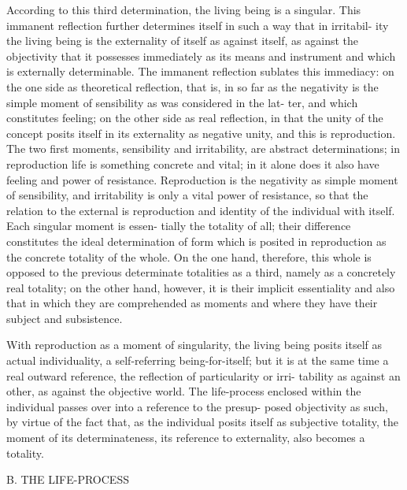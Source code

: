 According to this third determination, the living being is a singular. This
immanent reflection further determines itself in such a way that in irritabil-
ity the living being is the externality of itself as against itself, as against the
objectivity that it possesses immediately as its means and instrument and
which is externally determinable. The immanent reflection sublates this
immediacy: on the one side as theoretical reflection, that is, in so far as the
negativity is the simple moment of sensibility as was considered in the lat-
ter, and which constitutes feeling; on the other side as real reflection, in that
the unity of the concept posits itself in its externality as negative unity, and
this is reproduction.
 The two first moments, sensibility and irritability, are
abstract determinations; in reproduction life is something concrete and vital;
in it alone does it also have feeling and power of resistance. Reproduction
is the negativity as simple moment of sensibility, and irritability is only a
vital power of resistance, so that the relation to the external is reproduction
and identity of the individual with itself. Each singular moment is essen-
tially the totality of all; their difference constitutes the ideal determination
of form which is posited in reproduction as the concrete totality of the
whole. On the one hand, therefore, this whole is opposed to the previous
determinate totalities as a third, namely as a concretely real totality; on the
other hand, however, it is their implicit essentiality and also that in which
they are comprehended as moments and where they have their subject and
subsistence.

With reproduction as a moment of singularity, the living being posits
itself as actual individuality, a self-referring being-for-itself; but it is at the
same time a real outward reference, the reflection of particularity or irri-
tability as against an other, as against the objective world. The life-process
enclosed within the individual passes over into a reference to the presup-
posed objectivity as such, by virtue of the fact that, as the individual posits
itself as subjective totality, the moment of its determinateness, its reference to
externality, also becomes a totality.

B. THE LIFE-PROCESS

